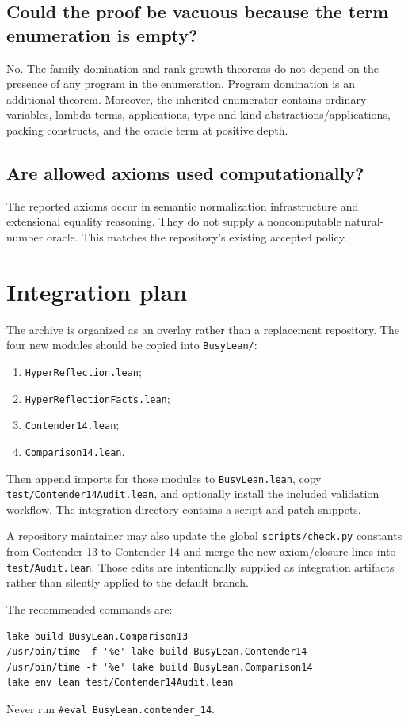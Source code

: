 \documentclass[11pt]{article}
\theoremstyle{definition}
\newcommand{\code}[1]{\texttt{#1}}
\begin{document}
\subsection{Could the proof be vacuous because the term enumeration is empty?}
No.  The family domination and rank-growth theorems do not depend on the presence of any program in the enumeration.  Program domination is an additional theorem.  Moreover, the inherited enumerator contains ordinary variables, lambda terms, applications, type and kind abstractions/applications, packing constructs, and the oracle term at positive depth.

\subsection{Are allowed axioms used computationally?}
The reported axioms occur in semantic normalization infrastructure and extensional equality reasoning.  They do not supply a noncomputable natural-number oracle.  This matches the repository's existing accepted policy.

\section{Integration plan}

The archive is organized as an overlay rather than a replacement repository.  The four new modules should be copied into \code{BusyLean/}:
\begin{enumerate}
\item \code{HyperReflection.lean};
\item \code{HyperReflectionFacts.lean};
\item \code{Contender14.lean};
\item \code{Comparison14.lean}.
\end{enumerate}
Then append imports for those modules to \code{BusyLean.lean}, copy \code{test/Contender14Audit.lean}, and optionally install the included validation workflow.  The integration directory contains a script and patch snippets.

A repository maintainer may also update the global \code{scripts/check.py} constants from Contender 13 to Contender 14 and merge the new axiom/closure lines into \code{test/Audit.lean}.  Those edits are intentionally supplied as integration artifacts rather than silently applied to the default branch.

The recommended commands are:
\begin{lstlisting}[language={},caption={Reproduction commands after applying the overlay.}]
lake build BusyLean.Comparison13
/usr/bin/time -f '%e' lake build BusyLean.Contender14
/usr/bin/time -f '%e' lake build BusyLean.Comparison14
lake env lean test/Contender14Audit.lean
\end{lstlisting}
Never run \code{\#eval BusyLean.contender\_14}.
\end{document}
